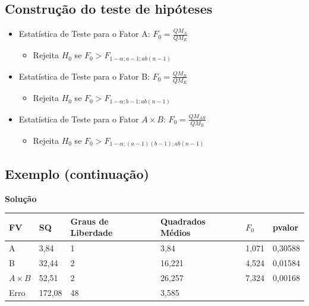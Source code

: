 \documentclass[
]{book}
\providecommand{\tightlist}{%
  \setlength{\itemsep}{0pt}\setlength{\parskip}{0pt}}
\begin{document}
\hypertarget{construuxe7uxe3o-do-teste-de-hipuxf3teses-1}{%
\subsection{Construção do teste de hipóteses}\label{construuxe7uxe3o-do-teste-de-hipuxf3teses-1}}

\begin{itemize}
\tightlist
\item
  Estatística de Teste para o Fator A: \(F_0=\frac{QM_A}{QM_E}\)

  \begin{itemize}
  \tightlist
  \item
    Rejeita \(H_0\) se \(F_0>F_{1-\alpha;a-1;ab(n-1)}\)
  \end{itemize}
\item
  Estatística de Teste para o Fator B: \(F_0=\frac{QM_B}{QM_E}\)

  \begin{itemize}
  \tightlist
  \item
    Rejeita \(H_0\) se \(F_0>F_{1-\alpha;b-1;ab(n-1)}\)
  \end{itemize}
\item
  Estatística de Teste para o Fator \(A\times B\): \(F_0=\frac{QM_{AB}}{QM_E}\)

  \begin{itemize}
  \tightlist
  \item
    Rejeita \(H_0\) se \(F_0>F_{1-\alpha;(a-1)(b-1);ab(n-1)}\)
  \end{itemize}
\end{itemize}

\hypertarget{exemplo-continuauxe7uxe3o}{%
\subsection{Exemplo (continuação)}\label{exemplo-continuauxe7uxe3o}}

\textbf{Solução}

\begin{longtable}[]{@{}llllll@{}}
\toprule
FV & SQ & Graus de Liberdade & Quadrados Médios & \(F_0\) & pvalor \\
\midrule
\endhead
A & 3,84 & 1 & 3,84 & 1,071 & 0,30588 \\
B & 32,44 & 2 & 16,221 & 4,524 & 0,01584 \\
\(A\times B\) & 52,51 & 2 & 26,257 & 7,324 & 0,00168 \\
Erro & 172,08 & 48 & 3,585 & & \\
\bottomrule
\end{longtable}
\end{document}
